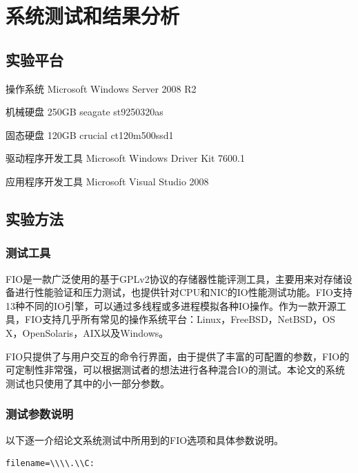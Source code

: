 
\chapter{系统测试和结果分析}
\label{cha:exp_analysis}

\section{实验平台}
\label{sec:exp_platform}

操作系统 Microsoft Windows Server 2008 R2

机械硬盘 250GB seagate st9250320as

固态硬盘 120GB crucial ct120m500ssd1

驱动程序开发工具 Microsoft Windows Driver Kit 7600.1

应用程序开发工具 Microsoft Visual Studio 2008

\section{实验方法}
\label{sec:exp_method}

\subsection{测试工具}
FIO是一款广泛使用的基于GPLv2协议的存储器性能评测工具，主要用来对存储设备进行性能验证和压力测试，也提供针对CPU和NIC的IO性能测试功能。FIO支持13种不同的IO引擎，可以通过多线程或多进程模拟各种IO操作。作为一款开源工具，FIO支持几乎所有常见的操作系统平台：Linux，FreeBSD，NetBSD，OS X，OpenSolaris，AIX以及Windows。

FIO只提供了与用户交互的命令行界面，由于提供了丰富的可配置的参数，FIO的可定制性非常强，可以根据测试者的想法进行各种混合IO的测试。本论文的系统测试也只使用了其中的小一部分参数。

\subsection{测试参数说明}

以下逐一介绍论文系统测试中所用到的FIO选项和具体参数说明。

\begin{lstlisting}
filename=\\\\.\\C:
\end{lstlisting}

